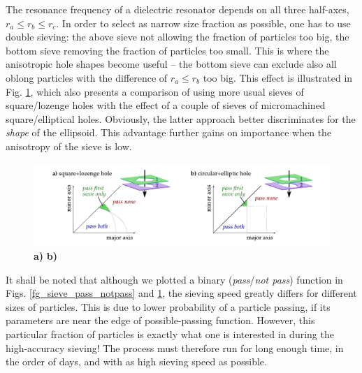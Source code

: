 The resonance frequency of a dielectric resonator depends on all three half-axes, $r_a \leq r_b \leq r_c$. In order to select as narrow size fraction as possible, one has to use double sieving: the above sieve not allowing the fraction of particles too big, the bottom sieve removing the fraction of particles too small. This is where the anisotropic hole shapes become useful -- the bottom sieve can exclude also all oblong particles with the difference of $r_a \leq r_b$ too big. This effect is illustrated in Fig. \ref{fg_double_sieving}, which also presents a comparison of using more usual sieves of square/lozenge holes with the effect of a couple of sieves of micromachined square/elliptical holes. Obviously, the latter approach better discriminates for the \textit{shape} of the ellipsoid. This advantage further gains on importance when the anisotropy of the sieve is low.
\begin{figure}[ht] \caption{\textbf{a)} \textbf{b)} } \label{fg_double_sieving} \centering 
\includegraphics[width=\textwidth]{img/technology/sieve_double_sieving_fractions.pdf}
\end{figure}

It shall be noted that although we plotted a binary (\textit{pass}/\textit{not pass}) function in Figs. \ref{fg_sieve_pass_notpass} and \ref{fg_double_sieving}, the sieving speed greatly differs for different sizes of particles. This is due to lower probability of a particle passing, if its parameters are near the edge of possible-passing function. 
However, this particular fraction of particles is exactly what one is interested in during the high-accuracy sieving! The process must therefore run for long enough time, in the order of days, and with as high sieving speed as possible.
